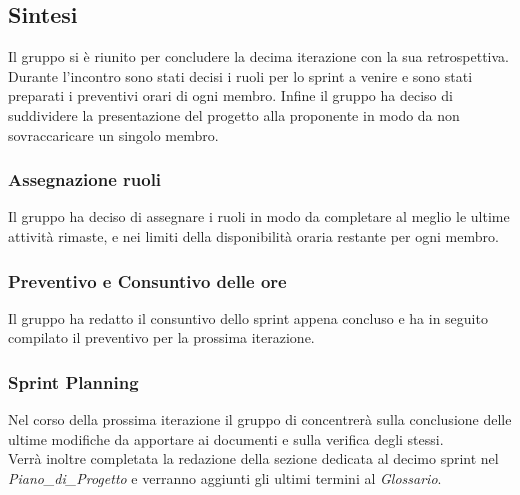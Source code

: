 \documentclass[10pt]{article}
\begin{document}
\subsection{Sintesi}
Il gruppo si è riunito per concludere la decima iterazione con la sua retrospettiva.\\
Durante l'incontro sono stati decisi i ruoli per lo sprint a venire e sono stati preparati i preventivi orari di ogni membro. Infine il
gruppo ha deciso di suddividere la presentazione del progetto alla proponente in modo da non sovraccaricare un singolo membro.\\

\subsubsection{Assegnazione ruoli}
Il gruppo ha deciso di assegnare i ruoli in modo da completare al meglio le ultime attività rimaste, e nei limiti della disponibilità oraria restante per ogni membro.

\subsubsection{Preventivo e Consuntivo delle ore}
Il gruppo ha redatto il consuntivo dello sprint appena concluso e ha in seguito compilato il preventivo per la prossima iterazione.

\subsubsection{Sprint Planning}
Nel corso della prossima iterazione il gruppo di concentrerà sulla conclusione delle ultime modifiche da apportare ai documenti e sulla verifica degli stessi.\\
Verrà inoltre completata la redazione della sezione dedicata al decimo sprint nel \textit{Piano\_di\_Progetto} e verranno aggiunti gli ultimi termini al \textit{Glossario}.\\
\end{document}
